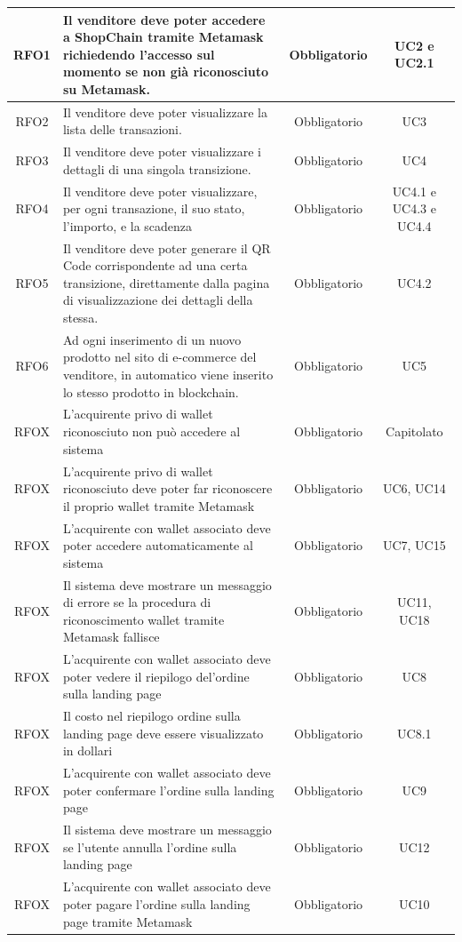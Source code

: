 \documentclass[a4paper, 12pt]{article}
\begin{document}
\begin{longtable}{|c|p{5cm}|c|c|}
\hline
RFO1 & Il venditore deve poter accedere a ShopChain tramite Metamask richiedendo l'accesso sul momento se non già riconosciuto su Metamask. & Obbligatorio & UC2 e UC2.1 \\
\hline
RFO2 & Il venditore deve poter visualizzare la lista delle transazioni. & Obbligatorio & UC3 \\ 
\hline
RFO3 & Il venditore deve poter visualizzare i dettagli di una singola transizione. & Obbligatorio & UC4 \\ 
\hline
RFO4 & Il venditore deve poter visualizzare, per ogni transazione, il suo stato, l'importo, e la scadenza & Obbligatorio & UC4.1 e UC4.3 e UC4.4 \\ 
\hline
RFO5 & Il venditore deve poter generare il QR Code corrispondente ad una certa transizione, direttamente dalla pagina di visualizzazione dei dettagli della stessa. & Obbligatorio & UC4.2 \\ 
\hline
RFO6 & Ad ogni inserimento di un nuovo prodotto nel sito di e-commerce del venditore, in automatico viene inserito lo stesso prodotto in blockchain. & Obbligatorio & UC5 \\ 
\hline
RFOX & L'acquirente privo di wallet riconosciuto non può accedere al sistema & Obbligatorio & Capitolato \\
\hline
RFOX & L'acquirente privo di wallet riconosciuto deve poter far riconoscere il proprio wallet tramite Metamask & Obbligatorio & UC6, UC14 \\
\hline
RFOX & L'acquirente con wallet associato deve poter accedere automaticamente al sistema & Obbligatorio & UC7, UC15 \\
\hline
RFOX & Il sistema deve mostrare un messaggio di errore se la procedura di riconoscimento wallet tramite Metamask fallisce & Obbligatorio & UC11, UC18 \\
\hline
RFOX & L'acquirente con wallet associato deve poter vedere il riepilogo del'ordine sulla landing page & Obbligatorio & UC8 \\
\hline
RFOX & Il costo nel riepilogo ordine sulla landing page deve essere visualizzato in dollari & Obbligatorio & UC8.1 \\
\hline
RFOX & L'acquirente con wallet associato deve poter confermare l'ordine sulla landing page & Obbligatorio & UC9 \\
\hline
RFOX & Il sistema deve mostrare un messaggio se l'utente annulla l'ordine sulla landing page & Obbligatorio & UC12 \\
\hline
RFOX & L'acquirente con wallet associato deve poter pagare l'ordine sulla landing page tramite Metamask & Obbligatorio & UC10 \\

\end{longtable}
\end{document}
